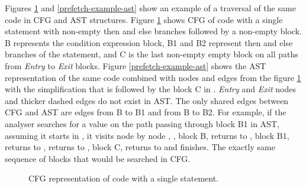 Figures \ref{prefetch-example-cfg} and \ref{prefetch-example-ast} show an example of a traversal of the same code in CFG and AST structures. Figure \ref{prefetch-example-cfg} shows CFG of code with a single  statement with non-empty then and else branches followed by a non-empty block. B represents the condition expression block, B1 and B2 represent then and else branches of the  statement, and C is the last non-empty empty block on all paths from \emph{Entry} to \emph{Exit} blocks. Figure \ref{prefetch-example-ast} shows the AST representation of the same code combined with nodes and edges from the figure \ref{prefetch-example-cfg} with the simplification that  is followed by the block C in . \emph{Entry} and \emph{Exit} nodes and thicker dashed edges do not exist in AST. The only shared edges between CFG and AST are edges from B to B1 and from B to B2. For example, if the analyser searches for a value on the path passing through block B1 in AST, assuming it starts in , it visits node by node , , block B, returns to , block B1, returns to , returns to , block C, returns to  and finishes. The exactly same sequence of blocks that would be searched in CFG.

\begin{figure}[h!]
\caption{CFG representation of code with a single  statement.}
\label{prefetch-example-cfg}
\vspace{.5cm}
\centering
{}
\end{figure}

